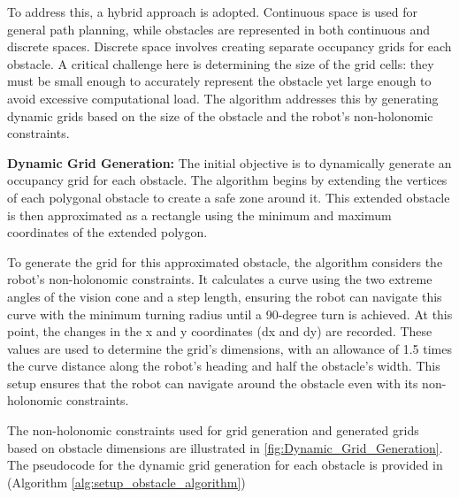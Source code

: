 \vspace{3mm}  

To address this, a hybrid approach is adopted. Continuous space is used for general path planning, while obstacles are represented in both continuous and discrete spaces. Discrete space involves creating separate occupancy grids for each obstacle. A critical challenge here is determining the size of the grid cells: they must be small enough to accurately represent the obstacle yet large enough to avoid excessive computational load. The algorithm addresses this by generating dynamic grids based on the size of the obstacle and the robot's non-holonomic constraints.

\vspace{3mm}  

\textbf{Dynamic Grid Generation:}
The initial objective is to dynamically generate an occupancy grid for each obstacle. The algorithm begins by extending the vertices of each polygonal obstacle to create a safe zone around it. This extended obstacle is then approximated as a rectangle using the minimum and maximum coordinates of the extended polygon.

\vspace{3mm}  

To generate the grid for this approximated obstacle, the algorithm considers the robot's non-holonomic constraints. It calculates a curve using the two extreme angles of the vision cone and a step length, ensuring the robot can navigate this curve with the minimum turning radius until a 90-degree turn is achieved. At this point, the changes in the x and y coordinates (dx and dy) are recorded. These values are used to determine the grid's dimensions, with an allowance of 1.5 times the curve distance along the robot's heading and half the obstacle's width. This setup ensures that the robot can navigate around the obstacle even with its non-holonomic constraints. 

\vspace{3mm}  

The non-holonomic constraints used for grid generation and generated grids based on obstacle dimensions are illustrated in \autoref{fig:Dynamic_Grid_Generation}. The pseudocode for the dynamic grid generation for each obstacle is provided in (Algorithm \autoref{alg:setup_obstacle_algorithm})


